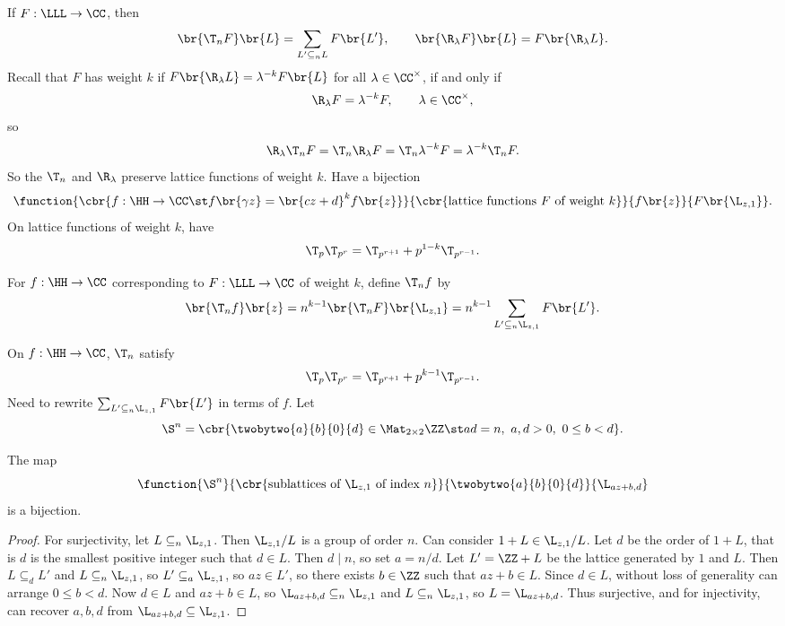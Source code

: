 
If $ F : \LLL \to \CC $, then
$$ \br{\T_nF}\br{L} = \sum_{L' \subseteq_n L} F\br{L'}, \qquad \br{\R_\lambda F}\br{L} = F\br{\R_\lambda L}. $$
Recall that $ F $ has weight $ k $ if $ F\br{\R_\lambda L} = \lambda^{-k}F\br{L} $ for all $ \lambda \in \CC^\times $, if and only if
$$ \R_\lambda F = \lambda^{-k}F, \qquad \lambda \in \CC^\times, $$
so
$$ \R_\lambda\T_nF = \T_n\R_\lambda F = \T_n\lambda^{-k}F = \lambda^{-k}\T_nF. $$
So the $ \T_n $ and $ \R_\lambda $ preserve lattice functions of weight $ k $. Have a bijection
$$ \function{\cbr{f : \HH \to \CC \st f\br{\gamma z} = \br{cz + d}^kf\br{z}}}{\cbr{\text{lattice functions} \ F \ \text{of weight} \ k}}{f\br{z}}{F\br{\L_{z, 1}}}. $$
On lattice functions of weight $ k $, have
$$ \T_p\T_{p^r} = \T_{p^{r + 1}} + p^{1 - k}\T_{p^{r - 1}}. $$

\begin{definition}
For $ f : \HH \to \CC $ corresponding to $ F : \LLL \to \CC $ of weight $ k $, define $ \T_nf $ by
$$ \br{\T_nf}\br{z} = n^{k - 1}\br{\T_nF}\br{\L_{z, 1}} = n^{k - 1}\sum_{L' \subseteq_n \L_{z, 1}} F\br{L'}. $$
\end{definition}

\pagebreak

On $ f : \HH \to \CC $, $ \T_n $ satisfy
$$ \T_p\T_{p^r} = \T_{p^{r + 1}} + p^{k - 1}\T_{p^{r - 1}}. $$
Need to rewrite $ \sum_{L' \subseteq_n \L_{z, 1}} F\br{L'} $ in terms of $ f $. Let
$$ \S^n = \cbr{\twobytwo{a}{b}{0}{d} \in \Mat_{2 \times 2} \ZZ \st ad = n, \ a, d > 0, \ 0 \le b < d}. $$

\begin{lemma}
The map
$$ \function{\S^n}{\cbr{\text{sublattices of} \ \L_{z, 1} \ \text{of index} \ n}}{\twobytwo{a}{b}{0}{d}}{\L_{az + b, d}} $$
is a bijection.
\end{lemma}

\begin{proof}
For surjectivity, let $ L \subseteq_n \L_{z, 1} $. Then $ \L_{z, 1} / L $ is a group of order $ n $. Can consider $ 1 + L \in \L_{z, 1} / L $. Let $ d $ be the order of $ 1 + L $, that is $ d $ is the smallest positive integer such that $ d \in L $. Then $ d \mid n $, so set $ a = n / d $. Let $ L' = \ZZ + L $ be the lattice generated by $ 1 $ and $ L $. Then $ L \subseteq_d L' $ and $ L \subseteq_n \L_{z, 1} $, so $ L' \subseteq_a \L_{z, 1} $, so $ az \in L' $, so there exists $ b \in \ZZ $ such that $ az + b \in L $. Since $ d \in L $, without loss of generality can arrange $ 0 \le b < d $. Now $ d \in L $ and $ az + b \in L $, so $ \L_{az + b, d} \subseteq_n \L_{z, 1} $ and $ L \subseteq_n \L_{z, 1} $, so $ L = \L_{az + b, d} $. Thus surjective, and for injectivity, can recover $ a, b, d $ from $ \L_{az + b, d} \subseteq \L_{z, 1} $.
\end{proof}

